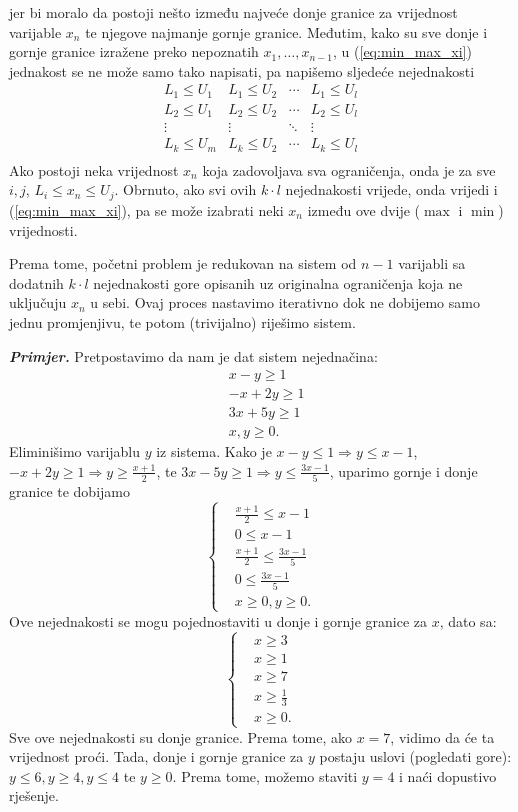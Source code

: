 \documentclass[a4paper, utf8, 11pt, colorlinks]{book}
\begin{document}
 jer bi moralo da postoji nešto između najveće donje granice za vrijednost varijable $x_n$ te njegove najmanje gornje granice. Međutim, kako su sve donje i gornje granice izražene preko nepoznatih $x_1, \ldots, x_{n-1}$,  u (\ref{eq:min_max_xi}) jednakost se ne može samo tako napisati, pa napišemo sljedeće nejednakosti 
 $$\begin{array}{cccc}
       L_1 \leq U_1 & L_1 \leq U_2   &  \cdots   & L_1 \leq U_l \\
       L_2 \leq U_1 & L_2  \leq U_2  &  \cdots   & L_2 \leq U_l \\
       \vdots       &     \vdots     &   \ddots  & \vdots       \\
       L_k \leq U_m &  L_k \leq U_2  &   \cdots  & L_k \leq U_l \\
 \end{array}$$ 
Ako postoji neka vrijednost  $x_n$ koja zadovoljava sva ograničenja, onda je za sve $i,j$, 
$L_i \leq x_n \leq U_j$. Obrnuto, ako svi ovih $k \cdot l$ nejednakosti vrijede, onda vrijedi i (\ref{eq:min_max_xi}), pa se može izabrati neki $x_n$ između ove dvije ($\max$ i $\min$) vrijednosti. 

Prema tome, početni problem je redukovan na sistem od $n-1$ varijabli sa dodatnih  $k \cdot l$ nejednakosti gore opisanih uz originalna ograničenja koja ne uključuju $x_n$ u sebi. Ovaj proces nastavimo iterativno dok ne dobijemo samo jednu promjenjivu, te potom (trivijalno) riješimo sistem. 

\emph{\textbf{Primjer.}} Pretpostavimo da nam je dat sistem nejednačina:
\begin{align*}
	 &x - y \geq 1 \\
	 &-x + 2y \geq 1 \\
	 & 3x + 5y \geq 1 \\
	 & x,y \geq 0.
\end{align*}
Eliminišimo varijablu $y$ iz sistema. Kako je $x-y \leq 1 \Rightarrow y \leq x -1 $, 
$-x + 2y \geq 1 \Rightarrow y \geq \frac{x+1}{2}$, te $ 3x - 5y \geq 1 \Rightarrow y \leq \frac{3x-1}{5}$, uparimo gornje i donje granice te dobijamo 
 $$
 \begin{cases}
 	&\frac{x+1}{2} \leq x-1 \\
 	& 0 \leq x-1 \\
 	& \frac{x+1}{2} \leq \frac{3x-1}{5} \\
 	& 0 \leq \frac{3x-1}{5} \\
 	& x \geq 0, y \geq 0.  	
 \end{cases}
 $$
Ove nejednakosti se mogu pojednostaviti u donje i gornje granice za $x$, dato sa:
$$
\begin{cases}
    &x \geq 3 \\
    & x \geq 1 \\
    & x \geq 7 \\
    & x \geq \frac{1}{3} \\
    & x \geq 0.	
\end{cases}
$$
Sve ove nejednakosti su donje granice. Prema tome, ako $x=7$, vidimo da će ta vrijednost proći. 
Tada, donje i gornje granice za $y$ postaju uslovi (pogledati gore): $y \leq 6, y \geq 4, y \leq 4$ te $y \geq 0$. Prema tome, možemo staviti $y=4$ i naći dopustivo rješenje. 
\end{document}
